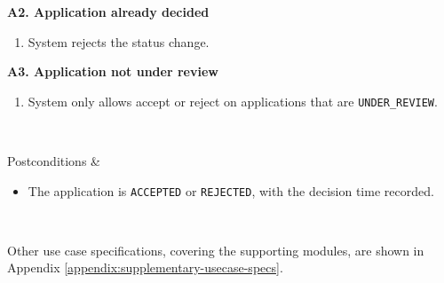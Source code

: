 \begin{usecasespectable}
	\textbf{A2. Application already decided}
	\begin{enumerate}
		\item System rejects the status change.
	\end{enumerate}

	\textbf{A3. Application not under review}
	\begin{enumerate}
		\item System only allows accept or reject on applications that are \texttt{UNDER\_REVIEW}.
	\end{enumerate}
	\\ \hline

	Postconditions &
	\begin{itemize}
		\item The application is \texttt{ACCEPTED} or \texttt{REJECTED}, with the decision time recorded.
	\end{itemize}
	\\ \hline

\end{usecasespectable}

Other use case specifications, covering the supporting modules, are shown in Appendix \ref{appendix:supplementary-usecase-specs}.